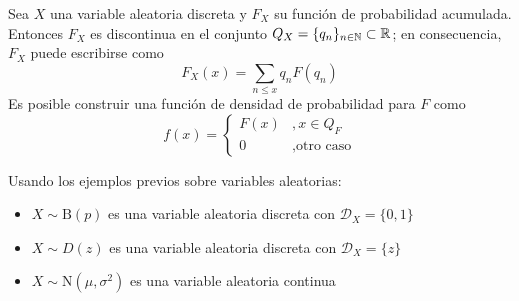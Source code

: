 \begin{proposicion}
Sea $X$ una variable aleatoria discreta y $F_X$ su función de probabilidad acumulada.
%
Entonces $F_X$ es discontinua en el conjunto $Q_X=\{q_n\}_{n\in \mathbb{N}} \subset \mathbb{R}$; en consecuencia, $F_X$ puede escribirse como 
\begin{equation}
F_X(x) = \sum_{n\leq x} q_n F({q_n})
\end{equation}
Es posible construir una función de densidad de probabilidad para $F$ como
\begin{equation}
f(x) = \begin{cases}
F({x}) &, x\in Q_F \\
0 &, \text{otro caso}
\end{cases}
\end{equation}
\end{proposicion}

\begin{ejemplo}
Usando los ejemplos previos sobre variables aleatorias:
\begin{itemize}
\item $X\sim \text{B}(p)$ es una variable aleatoria discreta con $\mathcal{D}_X = \{0,1\}$
\item $X\sim D(z)$ es una variable aleatoria discreta con $\mathcal{D}_X = \{z\}$
\item $X\sim \text{N}(\mu,\sigma^{2})$ es una variable aleatoria continua
\end{itemize}
\end{ejemplo}

